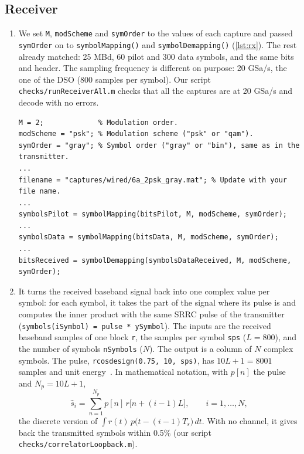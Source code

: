 \documentclass[11pt]{article}
\begin{document}
\subsection*{Receiver}
\begin{enumerate}[resume]
    \item We set \texttt{M}, \texttt{modScheme} and \texttt{symOrder} to the values of each capture and passed \texttt{symOrder} on to \texttt{symbolMapping()} and \texttt{symbolDemapping()} (\cref{lst:rx}). The rest already matched: 25 MBd, 60 pilot and 300 data symbols, and the same bits and header. The sampling frequency is different on purpose: 20 GSa/s, the one of the DSO (800 samples per symbol). Our script \texttt{checks/runReceiverAll.m} checks that all the captures are at 20 GSa/s and decode with no errors.

\begin{lstlisting}[caption={Our changes to \texttt{receiverSC.m}.}, label={lst:rx}]
M = 2;             % Modulation order.
modScheme = "psk"; % Modulation scheme ("psk" or "qam").
symOrder = "gray"; % Symbol order ("gray" or "bin"), same as in the transmitter.
...
filename = "captures/wired/6a_2psk_gray.mat"; % Update with your file name.
...
symbolsPilot = symbolMapping(bitsPilot, M, modScheme, symOrder);
...
symbolsData = symbolMapping(bitsData, M, modScheme, symOrder);
...
bitsReceived = symbolDemapping(symbolsDataReceived, M, modScheme, symOrder);
\end{lstlisting}

    \item It turns the received baseband signal back into one complex value per symbol: for each symbol, it takes the part of the signal where its pulse is and computes the inner product with the same SRRC pulse of the transmitter (\texttt{symbols(iSymbol) = pulse * ySymbol}). The inputs are the received baseband samples of one block \texttt{r}, the samples per symbol \texttt{sps} ($L = 800$), and the number of symbols \texttt{nSymbols} ($N$). The output is a column of $N$ complex symbols. The pulse, \texttt{rcosdesign(0.75, 10, sps)}, has $10L + 1 = 8001$ samples and unit energy~\cite{rcosdesign}. In mathematical notation, with $p[n]$ the pulse and $N_p = 10L+1$,
    \begin{equation}
        \hat{s}_i = \sum_{n=1}^{N_p} p[n]\, r\big[n + (i-1)L\big], \qquad i = 1, \dots, N,
    \end{equation}
    the discrete version of $\int r(t)\, p\big(t - (i-1)T_s\big)\, dt$. With no channel, it gives back the transmitted symbols within 0.5\% (our script \texttt{checks/correlatorLoopback.m}).


\end{enumerate}
\end{document}
